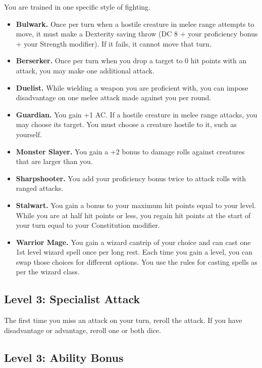 \documentclass[12pt,letterpaper,twocolumn,openany,nodeprecatedcode,bg=none]{dndbook}
\providecommand{\tightlist}{%
  \setlength{\itemsep}{0pt}\setlength{\parskip}{0pt}}
\let\oldsubsection\subsection
\renewcommand{\subsection}[1]{%
  \needspace{5\baselineskip}%
  \oldsubsection{#1}%
}
\begin{document}
You are trained in one specific style of fighting.

\begin{itemize}
\tightlist
\item
  \textbf{Bulwark.} Once per turn when a hostile creature in melee range
  attempts to move, it must make a Dexterity saving throw (DC 8 + your
  proficiency bonus + your Strength modifier). If it fails, it cannot
  move that turn.
\item
  \textbf{Berserker.} Once per turn when you drop a target to 0 hit
  points with an attack, you may make one additional attack.
\item
  \textbf{Duelist.} While wielding a weapon you are proficient with, you
  can impose disadvantage on one melee attack made against you per
  round.
\item
  \textbf{Guardian.} You gain +1 AC. If a hostile creature in melee
  range attacks, you may choose its target. You must choose a creature
  hostile to it, such as yourself.
\item
  \textbf{Monster Slayer.} You gain a +2 bonus to damage rolls against
  creatures that are larger than you.
\item
  \textbf{Sharpshooter.} You add your proficiency bonus twice to attack
  rolls with ranged attacks.
\item
  \textbf{Stalwart.} You gain a bonus to your maximum hit points equal
  to your level. While you are at half hit points or less, you regain
  hit points at the start of your turn equal to your Constitution
  modifier.
\item
  \textbf{Warrior Mage.} You gain a wizard cantrip of your choice and
  can cast one 1st level wizard spell once per long rest. Each time you
  gain a level, you can swap those choices for different options. You
  use the rules for casting spells as per the wizard class.
\end{itemize}

\subsection{Level 3: Specialist Attack}\label{level-3-specialist-attack}

The first time you miss an attack on your turn, reroll the attack. If
you have disadvantage or advantage, reroll one or both dice.

\subsection{Level 3: Ability Bonus}\label{level-3-ability-bonus}
\end{document}
